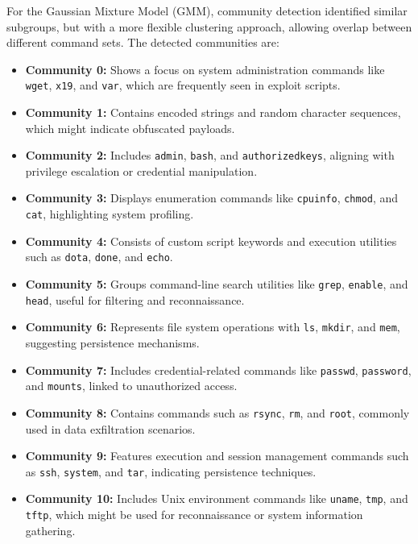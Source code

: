         For the Gaussian Mixture Model (GMM), community detection identified similar subgroups, but with a more flexible clustering approach, allowing overlap between different command sets. The detected communities are:

        \begin{itemize}
        \item \textbf{Community 0:} Shows a focus on system administration commands like \texttt{wget}, \texttt{x19}, and \texttt{var}, which are frequently seen in exploit scripts.
        \item \textbf{Community 1:} Contains encoded strings and random character sequences, which might indicate obfuscated payloads.
        \item \textbf{Community 2:} Includes \texttt{admin}, \texttt{bash}, and \texttt{authorizedkeys}, aligning with privilege escalation or credential manipulation.
        \item \textbf{Community 3:} Displays enumeration commands like \texttt{cpuinfo}, \texttt{chmod}, and \texttt{cat}, highlighting system profiling.
        \item \textbf{Community 4:} Consists of custom script keywords and execution utilities such as \texttt{dota}, \texttt{done}, and \texttt{echo}.
        \item \textbf{Community 5:} Groups command-line search utilities like \texttt{grep}, \texttt{enable}, and \texttt{head}, useful for filtering and reconnaissance.
        \item \textbf{Community 6:} Represents file system operations with \texttt{ls}, \texttt{mkdir}, and \texttt{mem}, suggesting persistence mechanisms.
        \item \textbf{Community 7:} Includes credential-related commands like \texttt{passwd}, \texttt{password}, and \texttt{mounts}, linked to unauthorized access.
        \item \textbf{Community 8:} Contains commands such as \texttt{rsync}, \texttt{rm}, and \texttt{root}, commonly used in data exfiltration scenarios.
        \item \textbf{Community 9:} Features execution and session management commands such as \texttt{ssh}, \texttt{system}, and \texttt{tar}, indicating persistence techniques.
        \item \textbf{Community 10:} Includes Unix environment commands like \texttt{uname}, \texttt{tmp}, and \texttt{tftp}, which might be used for reconnaissance or system information gathering.
        \end{itemize}
    
